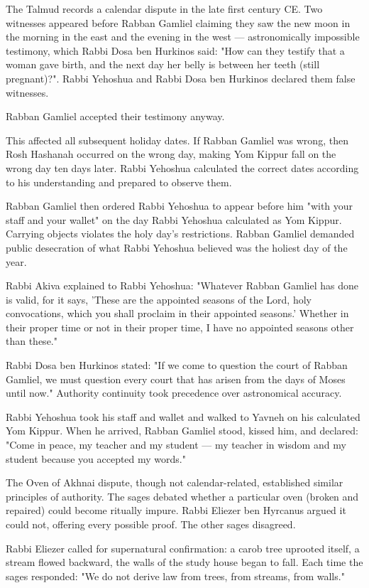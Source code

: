 The Talmud records a calendar dispute in the late first century CE. Two witnesses appeared before Rabban Gamliel claiming they saw the new moon in the morning in the east and the evening in the west — astronomically impossible testimony, which Rabbi Dosa ben Hurkinos said: "How can they testify that a woman gave birth, and the next day her belly is between her teeth (still pregnant)?". Rabbi Yehoshua and Rabbi Dosa ben Hurkinos declared them false witnesses.

Rabban Gamliel accepted their testimony anyway.

This affected all subsequent holiday dates. If Rabban Gamliel was wrong, then Rosh Hashanah occurred on the wrong day, making Yom Kippur fall on the wrong day ten days later. Rabbi Yehoshua calculated the correct dates according to his understanding and prepared to observe them.

Rabban Gamliel then ordered Rabbi Yehoshua to appear before him "with your staff and your wallet" on the day Rabbi Yehoshua calculated as Yom Kippur. Carrying objects violates the holy day's restrictions. Rabban Gamliel demanded public desecration of what Rabbi Yehoshua believed was the holiest day of the year.

Rabbi Akiva explained to Rabbi Yehoshua: "Whatever Rabban Gamliel has done is valid, for it says, 'These are the appointed seasons of the Lord, holy convocations, which you shall proclaim in their appointed seasons.' Whether in their proper time or not in their proper time, I have no appointed seasons other than these."

Rabbi Dosa ben Hurkinos stated: "If we come to question the court of Rabban Gamliel, we must question every court that has arisen from the days of Moses until now." Authority continuity took precedence over astronomical accuracy.

Rabbi Yehoshua took his staff and wallet and walked to Yavneh on his calculated Yom Kippur. When he arrived, Rabban Gamliel stood, kissed him, and declared: "Come in peace, my teacher and my student — my teacher in wisdom and my student because you accepted my words."

The Oven of Akhnai dispute, though not calendar-related, established similar principles of authority. The sages debated whether a particular oven (broken and repaired) could become ritually impure. Rabbi Eliezer ben Hyrcanus argued it could not, offering every possible proof. The other sages disagreed.

Rabbi Eliezer called for supernatural confirmation: a carob tree uprooted itself, a stream flowed backward, the walls of the study house began to fall. Each time the sages responded: "We do not derive law from trees, from streams, from walls."

